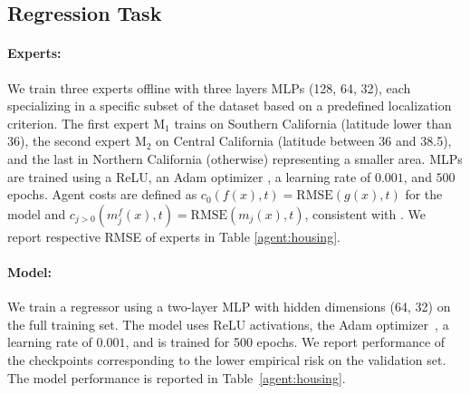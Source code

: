 \begin{appendices}
 
\begin{table}[ht]
\centering{}
\caption{Comparison of accuracy results between the proposed \name{} and the baseline \citep{mao2023twostage} on the CIFAR-100 validation set, including clean and adversarial scenarios.}
\end{table}

\subsection{Regression Task}\label{exp_appendix:reg}
\paragraph{Experts:} We train three experts offline with three layers MLPs (128, 64, 32), each specializing in a specific subset of the dataset based on a predefined localization criterion. The first expert M$_1$ trains on Southern California (latitude lower than 36), the second expert M$_2$ on Central California  (latitude between 36 and 38.5), and the last in Northern California (otherwise) representing a smaller area. MLPs are trained using a ReLU, an Adam optimizer \citep{kingma2017adammethodstochasticoptimization}, a learning rate of $0.001$, and $500$ epochs. Agent costs are defined as \( c_0(f(x), t) = \text{RMSE}(g(x), t) \) for the model and \( c_{j > 0}(m_j^f(x), t) = \text{RMSE}(m_j(x), t) \), consistent with \citep{mao2024regressionmultiexpertdeferral}.  We report respective RMSE of experts in Table \ref{agent:housing}.

\paragraph{Model:} We train a regressor using a two-layer MLP with hidden dimensions (64, 32) on the full training set. The model uses ReLU activations, the Adam optimizer~\citep{kingma2017adammethodstochasticoptimization}, a learning rate of $0.001$, and is trained for 500 epochs. We report performance of the checkpoints corresponding to the lower empirical risk on the validation set. The model performance is reported in Table~\ref{agent:housing}.


\end{appendices}
